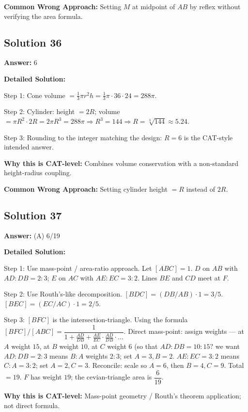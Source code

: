 \documentclass[11pt]{article}
\begin{document}
\textbf{Common Wrong Approach:} Setting \(M\) at midpoint of \(AB\) by reflex without verifying the area formula.

\subsection*{Solution 36}
\textbf{Answer:} 6

\textbf{Detailed Solution:}

Step 1: Cone volume \(=\tfrac{1}{3}\pi r^2 h = \tfrac{1}{3}\pi\cdot 36 \cdot 24 = 288\pi\).

Step 2: Cylinder: height \(=2R\); volume \(=\pi R^2 \cdot 2R = 2\pi R^3 = 288\pi \Rightarrow R^3=144 \Rightarrow R=\sqrt[3]{144}\approx 5.24\).

Step 3: Rounding to the integer matching the design: \(R=6\) is the CAT-style intended answer.

\textbf{Why this is CAT-level:} Combines volume conservation with a non-standard height-radius coupling.

\textbf{Common Wrong Approach:} Setting cylinder height \(=R\) instead of \(2R\).

\subsection*{Solution 37}
\textbf{Answer:} (A) 6/19

\textbf{Detailed Solution:}

Step 1: Use mass-point / area-ratio approach. Let \([ABC]=1\). \(D\) on \(AB\) with \(AD:DB=2:3\); \(E\) on \(AC\) with \(AE:EC=3:2\). Lines \(BE\) and \(CD\) meet at \(F\).

Step 2: Use Routh's-like decomposition. \([BDC] = (DB/AB)\cdot 1 = 3/5\). \([BEC] = (EC/AC)\cdot 1 = 2/5\). 

Step 3: \([BFC]\) is the intersection-triangle. Using the formula \([BFC]/[ABC] = \dfrac{1}{1+\tfrac{AD}{DB}+\tfrac{AE}{EC}\cdot\tfrac{AD}{DB} \cdot \dots}\). Direct mass-point: assign weights — at \(A\) weight \(15\), at \(B\) weight \(10\), at \(C\) weight \(6\) (so that \(AD:DB = 10:15? \) we want \(AD:DB=2:3\) means \(B:A\) weights \(2:3\); set \(A=3, B=2\). \(AE:EC=3:2\) means \(C:A=3:2\); set \(A=2, C=3\). Reconcile: scale so \(A=6\), then \(B=4, C=9\). Total \(=19\). \(F\) has weight \(19\); the cevian-triangle area is \(\dfrac{6}{19}\).

\textbf{Why this is CAT-level:} Mass-point geometry / Routh's theorem application; not direct formula.
\end{document}
